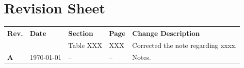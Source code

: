 
\chapter*{Revision Sheet}%
\setcounter{page}{2}

\begin{table}[h!]\scriptsize\begin{center}
		\begin{tabular}{|p{0.8cm}|p{2.0cm}|p{2cm}|p{1cm}|p{8cm}|}\hline
			\textbf{Rev. }& \textbf{Date} & \textbf{Section} & \textbf{Page}& \textbf{Change Description} \\ 
			\hline
			
			&  & Table XXX & XXX & Corrected the note regarding xxxx. \\
			
			
			\textbf{A} & \today & --  & -- & Notes.  \\
			
			
			
			
			\hline\end{tabular}\end{center}\end{table}